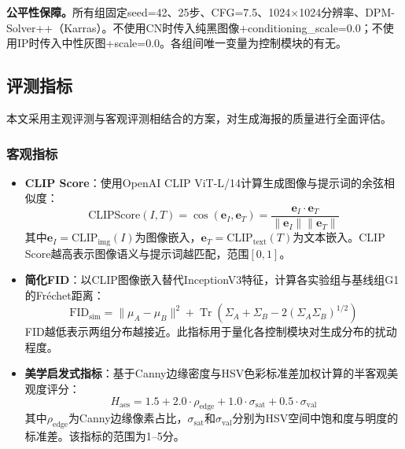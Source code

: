 \documentclass[12pt,a4paper]{ctexart}
\begin{document}
\textbf{公平性保障。}所有组固定seed=42、25步、CFG=7.5、1024$\times$1024分辨率、DPM-Solver++（Karras）。不使用CN时传入纯黑图像+conditioning\_scale=0.0；不使用IP时传入中性灰图+scale=0.0。各组间唯一变量为控制模块的有无。

\subsection{评测指标}

本文采用主观评测与客观评测相结合的方案，对生成海报的质量进行全面评估。

\subsubsection{客观指标}
\begin{itemize}[itemsep=2pt,topsep=4pt]
    \item \textbf{CLIP Score}：使用OpenAI CLIP ViT-L/14计算生成图像与提示词的余弦相似度：
    \begin{equation}
        \text{CLIPScore}(I, T) = \cos(\mathbf{e}_I, \mathbf{e}_T) = \frac{\mathbf{e}_I \cdot \mathbf{e}_T}{\|\mathbf{e}_I\| \|\mathbf{e}_T\|}
    \end{equation}
    其中$\mathbf{e}_I = \text{CLIP}_{\text{img}}(I)$为图像嵌入，$\mathbf{e}_T = \text{CLIP}_{\text{text}}(T)$为文本嵌入。CLIP Score越高表示图像语义与提示词越匹配，范围$[0,1]$。

    \item \textbf{简化FID}：以CLIP图像嵌入替代InceptionV3特征，计算各实验组与基线组G1的Fr\'echet距离：
    \begin{equation}
        \text{FID}_{\text{sim}} = \|\mu_A - \mu_B\|^2 + \operatorname{Tr}\left(\Sigma_A + \Sigma_B - 2(\Sigma_A \Sigma_B)^{1/2}\right)
    \end{equation}
    FID越低表示两组分布越接近。此指标用于量化各控制模块对生成分布的扰动程度。

    \item \textbf{美学启发式指标}：基于Canny边缘密度与HSV色彩标准差加权计算的半客观美观度评分：
    \begin{equation}
        H_{\text{aes}} = 1.5 + 2.0 \cdot \rho_{\text{edge}} + 1.0 \cdot \sigma_{\text{sat}} + 0.5 \cdot \sigma_{\text{val}}
    \end{equation}
    其中$\rho_{\text{edge}}$为Canny边缘像素占比，$\sigma_{\text{sat}}$和$\sigma_{\text{val}}$分别为HSV空间中饱和度与明度的标准差。该指标的范围为1--5分。
\end{itemize}
\end{document}
